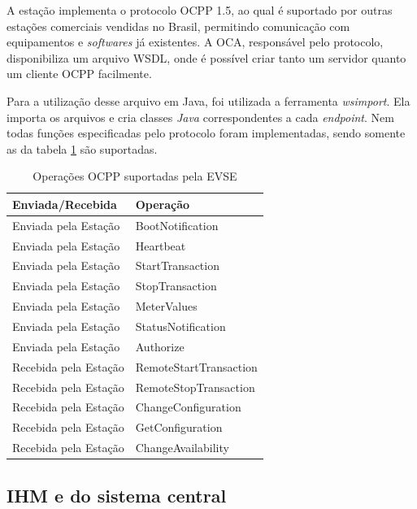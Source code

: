       A estação implementa o protocolo \ac{OCPP} 1.5, ao qual é suportado por outras estações comerciais vendidas no Brasil, permitindo comunicação com equipamentos e \textit{softwares} já existentes. A \ac{OCA}, responsável pelo protocolo, disponibiliza um arquivo WSDL, onde é possível criar tanto um servidor quanto um cliente OCPP facilmente.

      Para a utilização desse arquivo em Java, foi utilizada a ferramenta \textit{wsimport}. Ela importa os arquivos e cria classes \textit{Java} correspondentes a cada \textit{endpoint}. Nem todas funções especificadas pelo protocolo foram implementadas, sendo somente as da tabela \ref{table:ocpp} são suportadas.

      \begin{table}[]
        \centering
        \caption{Operações OCPP suportadas pela \ac{EVSE}}
        \label{table:ocpp}
        \begin{tabular}{@{}ll@{}}
          \toprule
          \textbf{Enviada/Recebida} & \textbf{Operação}      \\ \midrule
            Enviada pela Estação      & BootNotification       \\
            Enviada pela Estação      & Heartbeat              \\
            Enviada pela Estação      & StartTransaction       \\
            Enviada pela Estação      & StopTransaction        \\
            Enviada pela Estação      & MeterValues            \\
            Enviada pela Estação      & StatusNotification     \\
            Enviada pela Estação      & Authorize              \\
            Recebida pela Estação     & RemoteStartTransaction \\
            Recebida pela Estação     & RemoteStopTransaction  \\
            Recebida pela Estação     & ChangeConfiguration    \\
            Recebida pela Estação     & GetConfiguration       \\
            Recebida pela Estação     & ChangeAvailability     \\ \bottomrule
        \end{tabular}
      \end{table}

    \subsection{IHM e do sistema central}

